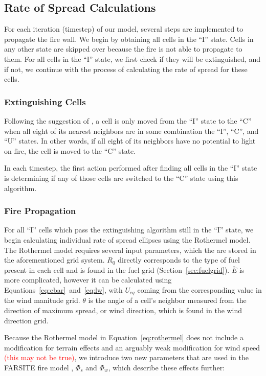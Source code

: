 \documentclass{article}
\newcommand{\note}[1]{\textcolor{red}{#1}}
\begin{document}
\subsection{Rate of Spread Calculations}
For each iteration (timestep) of our model, several steps are implemented to propagate the fire wall. We begin by obtaining all cells in the ``I'' state. Cells in any other state are skipped over because the fire is not able to propagate to them. For all cells in the ``I'' state, we first check if they will be extinguished, and if not, we continue with the process of calculating the rate of spread for these cells. 

\subsubsection{Extinguishing Cells}
Following the suggestion of \cite{ghisu15}, a cell is only moved from the ``I'' state to the ``C'' when all eight of its nearest neighbors are in some combination the ``I'', ``C'', and ``U'' states. In other words, if all eight of its neighbors have no potential to light on fire, the cell is moved to the ``C'' state. 

In each timestep, the first action performed after finding all cells in the ``I'' state is determining if any of those cells are switched to the ``C'' state using this algorithm. 

\subsubsection{Fire Propagation\label{sec:propagation}}
For all ``I'' cells which pass the extinguishing algorithm still in the ``I'' state, we begin calculating individual rate of spread ellipses using the Rothermel model. The Rothermel model requires several input parameters, which the are stored in the aforementioned grid system. $R_0$ directly corresponds to the type of fuel present in each cell and is found in the fuel grid (Section~\ref{sec:fuelgrid}). $\overline{E}$ is more complicated, however it can be calculated using Equations~\ref{eq:ebar}~and~\ref{eq:lw}, with $U_{eq}$ coming from the corresponding value in the wind manitude grid. $\theta$ is the angle of a cell's neighbor measured from the direction of maximum spread, or wind direction, which is found in the wind direction grid. 

Because the Rothermel model in Equation~\ref{eq:rothermel} does not include a modification for terrain effects and an arguably weak modification for wind speed \note{(this may not be true)}, we introduce two new parameters that are used in the FARSITE fire model \cite{}, $\Phi_s$ and $\Phi_w$, which describe these effects further:
\end{document}
